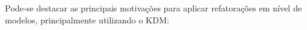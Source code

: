 

Pode-se destacar as principais motivações para aplicar refatorações em nível de modelos, principalmente utilizando o KDM:

